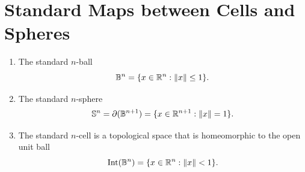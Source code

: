 





\section{Standard Maps between Cells and Spheres}\label{sec:cells-spheres}

\begin{definition}\label{def:std-ball-sphere-cell}
\begin{enumerate}
    \item The standard $n$-ball
    \[\mathbb{B}^n = \{x \in \mathbb{R}^n: \lVert x\rVert \leq 1\}.\]
    
    \item The standard $n$-sphere
    \[\mathbb{S}^n= \partial(\mathbb{B}^{n+1}) = \{x \in \mathbb{R}^{n+1}: \lVert x\rVert =1\}.\]

    \item The standard $n$-cell is a topological space that is homeomorphic to the open unit ball 
    \[\operatorname{Int}(\mathbb{B}^n) = \{x \in \mathbb{R}^n: \lVert x\rVert < 1\}.\]
\end{enumerate}
\end{definition}

